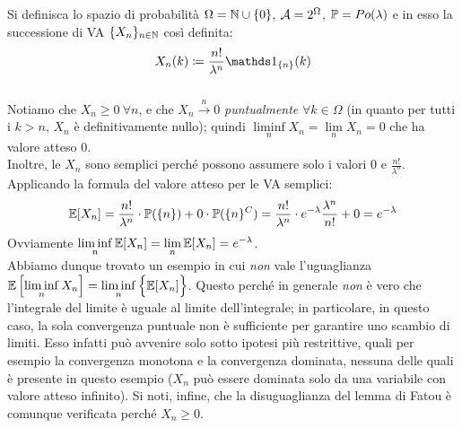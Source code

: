 \bigskip
\begin{ceseb}
Si definisca lo spazio di probabilità $\Omega = \mathbb N \cup \{0\}$, $\mathcal A = 2^\Omega$, $\mathbb P = Po (\lambda)$
e in esso la successione di VA $\{X_n\}_{n \in \mathbb N}$ così definita:
$$ X_n (k) \coloneqq \frac{n!}{\lambda^n} \Ind_{\{n\} }(k)$$ \\
Notiamo che $X_n \ge 0 \ \forall n$, e che $X_n \xrightarrow{n}0$ \emph{puntualmente} $\forall k \in \Omega$
(in quanto per tutti i $k > n$, $X_n$ è definitivamente nullo);
quindi $\liminf\limits_n{X_n} = \lim\limits_n{X_n} = 0$ che ha valore atteso $0$. \\
Inoltre, le $X_n$ sono semplici perché possono assumere solo i valori $0$ e $\frac{n!}{\lambda^n}$. Applicando la formula del valore atteso per le VA semplici:
$$ \mathbb E[X_n] = \frac{n!}{\lambda^n} \cdot \mathbb P (\{n\}) + 0 \cdot \mathbb P(\{n\}^C) =
\frac{n!}{\lambda^n} \cdot e^{-\lambda} \frac{\lambda^n}{n!} + 0 = e^{-\lambda}$$
Ovviamente $\liminf\limits_n{\mathbb E [X_n]} = \lim\limits_n{\mathbb E [X_n]} = e^{-\lambda}$. \\
Abbiamo dunque trovato un esempio in cui \emph{non} vale l'uguaglianza $ \mathbb E\left[\liminf\limits_n{X_n}\right] = \liminf\limits_n\Big\{\mathbb E[X_n] \Big\}$.
Questo perché in generale \emph{non} è vero che l'integrale del limite è uguale al limite dell'integrale;
in particolare, in questo caso, la sola convergenza puntuale non è sufficiente per garantire uno scambio di limiti.
Esso infatti può avvenire solo sotto ipotesi più restrittive, quali per esempio la convergenza monotona e la convergenza dominata,
nessuna delle quali è presente in questo esempio ($X_n$ può essere dominata solo da una variabile con valore atteso infinito).
Si noti, infine, che la disuguaglianza del lemma di Fatou è comunque verificata perché $X_n \ge 0$.
\end{ceseb}

